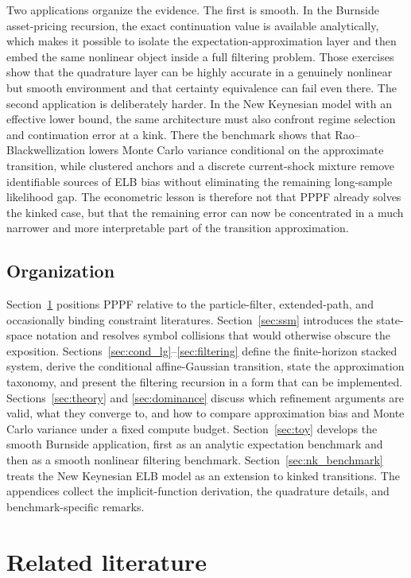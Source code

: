\documentclass[11pt]{article}
\theoremstyle{remark}
\begin{document}
Two applications organize the evidence.
The first is smooth.
In the Burnside asset-pricing recursion, the exact continuation value is available analytically, which makes it possible to isolate the expectation-approximation layer and then embed the same nonlinear object inside a full filtering problem.
Those exercises show that the quadrature layer can be highly accurate in a genuinely nonlinear but smooth environment and that certainty equivalence can fail even there.
The second application is deliberately harder.
In the New Keynesian model with an effective lower bound, the same architecture must also confront regime selection and continuation error at a kink.
There the benchmark shows that Rao--Blackwellization lowers Monte Carlo variance conditional on the approximate transition, while clustered anchors and a discrete current-shock mixture remove identifiable sources of ELB bias without eliminating the remaining long-sample likelihood gap.
The econometric lesson is therefore not that PPPF already solves the kinked case, but that the remaining error can now be concentrated in a much narrower and more interpretable part of the transition approximation.

\subsection{Organization}

Section~\ref{sec:lit} positions PPPF relative to the particle-filter, extended-path, and occasionally binding constraint literatures.
Section~\ref{sec:ssm} introduces the state-space notation and resolves symbol collisions that would otherwise obscure the exposition.
Sections~\ref{sec:cond_lg}--\ref{sec:filtering} define the finite-horizon stacked system, derive the conditional affine-Gaussian transition, state the approximation taxonomy, and present the filtering recursion in a form that can be implemented.
Sections~\ref{sec:theory} and \ref{sec:dominance} discuss which refinement arguments are valid, what they converge to, and how to compare approximation bias and Monte Carlo variance under a fixed compute budget.
Section~\ref{sec:toy} develops the smooth Burnside application, first as an analytic expectation benchmark and then as a smooth nonlinear filtering benchmark.
Section~\ref{sec:nk_benchmark} treats the New Keynesian ELB model as an extension to kinked transitions.
The appendices collect the implicit-function derivation, the quadrature details, and benchmark-specific remarks.

\section{Related literature}
\label{sec:lit}
\end{document}
